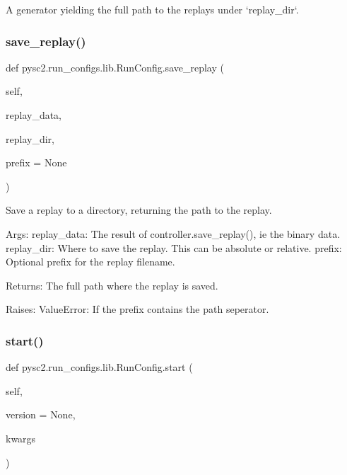 \begin{DoxyVerb}A generator yielding the full path to the replays under `replay_dir`.\end{DoxyVerb}
 \mbox{\label{classpysc2_1_1run__configs_1_1lib_1_1_run_config_a7ba199b4c7d8503dd9d8bbdbdf13ede8}} 
\subsubsection{\texorpdfstring{save\+\_\+replay()}{save\_replay()}}
{\footnotesize\ttfamily def pysc2.\+run\+\_\+configs.\+lib.\+Run\+Config.\+save\+\_\+replay (\begin{DoxyParamCaption}\item[{}]{self,  }\item[{}]{replay\+\_\+data,  }\item[{}]{replay\+\_\+dir,  }\item[{}]{prefix = {\ttfamily None} }\end{DoxyParamCaption})}

\begin{DoxyVerb}Save a replay to a directory, returning the path to the replay.

Args:
  replay_data: The result of controller.save_replay(), ie the binary data.
  replay_dir: Where to save the replay. This can be absolute or relative.
  prefix: Optional prefix for the replay filename.

Returns:
  The full path where the replay is saved.

Raises:
  ValueError: If the prefix contains the path seperator.
\end{DoxyVerb}
 \mbox{\label{classpysc2_1_1run__configs_1_1lib_1_1_run_config_a3fb702fa3f4fe48d6d4fe2f3cfe289e8}} 
\subsubsection{\texorpdfstring{start()}{start()}}
{\footnotesize\ttfamily def pysc2.\+run\+\_\+configs.\+lib.\+Run\+Config.\+start (\begin{DoxyParamCaption}\item[{}]{self,  }\item[{}]{version = {\ttfamily None},  }\item[{}]{kwargs }\end{DoxyParamCaption})}


